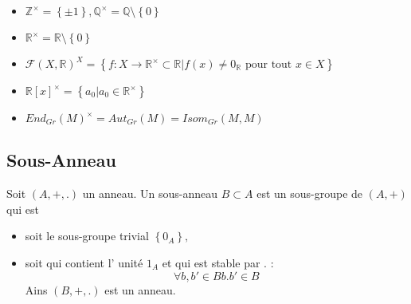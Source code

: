 \documentclass[../main.tex]{subfiles}
\begin{document}
\begin{exemple}
\begin{itemize}
\item $\mathbb{Z}^{\times} = \left\{ \pm 1 \right\}, \mathbb{Q}^{\times} = \mathbb{Q}\setminus \left\{ 0 \right\} $
\item $\mathbb{R}^{\times} = \mathbb{R} \setminus \left\{ 0 \right\} $ 
\item $\mathcal{F}(X, \mathbb{R})^{X} = \left\{ f: X \to \mathbb{R}^{\times} \subset \mathbb{R} | f(x) \neq 0_{\mathbb{R}} \text{ pour tout  } x \in X \right\} $
\item $\mathbb{R}[x]^{\times}=  \left\{ a_0 | a_0 \in \mathbb{R}^{\times} \right\} $
\item $End_{Gr} ( M)^{\times}=Aut_{Gr} ( M) = Isom_{Gr} ( M,M)$
\end{itemize}
\end{exemple}
\subsection{Sous-Anneau}
\begin{defn}\label{defn:sous_anneau}
	Soit $(A, + , .)$ un anneau. Un sous-anneau $B \subset A$ est un sous-groupe de $(A,+)$ qui est
	\begin{itemize}
	\item soit le sous-groupe trivial $ \left\{ 0_A \right\} ,$ 
	\item soit qui contient l' unité $1_A$ et qui est stable par . :
		\[ 
		\forall b,b' \in B b.b' \in B
		\]
		Ains $(B, + , .)$ est un anneau.
	\end{itemize}
\end{defn}
\end{document}
